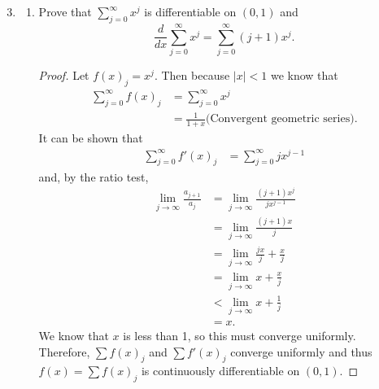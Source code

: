 \documentclass{article}
\begin{document}
\begin{enumerate}
      \setcounter{enumi}{2}
      \item \begin{enumerate}
                  \item Prove that $\sum_{j=0}^\infty x^j$ is differentiable
                        on $(0,1)$ and
                        \[
                              \frac{d}{dx}\sum_{j=0}^\infty x^j= \sum_{j=0}^\infty(j+1)x^j.
                        \]
                        \begin{proof}
                              Let $f(x)_j=x^j$. Then because $\lvert x\rvert<1$ we know that
                              \begin{align*}
                                    \sum_{j=0}^\infty f(x)_j & = \sum_{j=0}^\infty x^j                                 \\
                                                             & = \frac{1}{1+x} \textrm{(Convergent geometric series)}.
                              \end{align*}
                              It can be shown that
                              \begin{align*}
                                    \sum_{j=0}^\infty f'(x)_j & = \sum_{j=0}^\infty jx^{j-1}
                              \end{align*}
                              and, by the ratio test,
                              \begin{align*}
                                    \lim_{j\to\infty}\frac{a_{j+1}}{a_j} & = \lim_{j\to\infty} \frac{(j+1)x^j}{jx^{j-1}}  \\
                                                                         & = \lim_{j\to\infty} \frac{(j+1)x}{j}           \\
                                                                         & = \lim_{j\to\infty} \frac{jx}{j} + \frac{x}{j} \\
                                                                         & = \lim_{j\to\infty} x + \frac{x}{j}            \\
                                                                         & < \lim_{j\to\infty} x + \frac{1}{j}            \\
                                                                         & = x.
                              \end{align*}
                              We know that $x$ is less than 1, so this must converge uniformly.
                              Therefore, $\sum f(x)_j$ and $\sum f'(x)_j$ converge uniformly and thus
                              $f(x)=\sum f(x)_j$ is continuously differentiable on $(0,1)$.


\end{proof}
\end{enumerate}
\end{enumerate}
\end{document}
